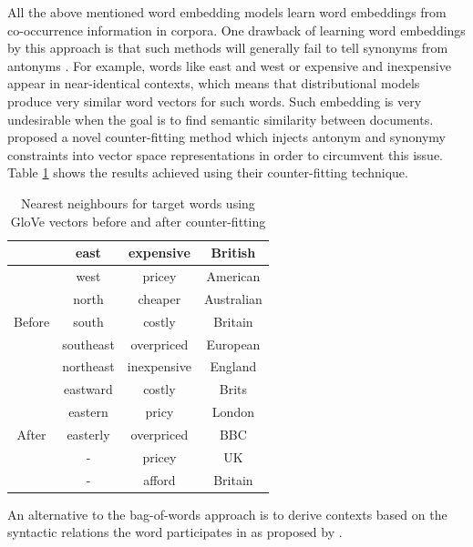  
 All the above mentioned word embedding models learn word embeddings from co-occurrence information in corpora.
 One drawback of learning word embeddings by this approach is that such methods will generally fail to tell synonyms from
 antonyms \citep{mohammad2008computing}. For example, words like east and west
 or expensive and inexpensive appear in near-identical contexts, which means
 that distributional models produce very similar word vectors for such words. Such embedding is very undesirable when the goal is to find semantic similarity between documents. 
 \citet{mrksic:2016:naacl} proposed a novel counter-fitting method which injects antonym and
 synonymy constraints into vector space representations in order to circumvent this issue. Table \ref{tab:counter_fitting} shows the results \citet{mrksic:2016:naacl} achieved using their counter-fitting technique.
 
 \begin{table}[h]
 	\begin{center}
 		\begin{tabular}{ c c c c } 
 			\hline
 			& east & expensive & British \\
 			\hline
 			\multirow{5}{4em}{Before} &
 			
 			west & pricey &  American
 			\\ 
 			& north & cheaper & Australian\\ 
 			& south & costly & Britain\\ 
 			& southeast & overpriced & European\\
 			& northeast & inexpensive & England\\
 			\hline
 			\multirow{5}{4em}{After} & 
 			eastward & costly & Brits\\ 
 			& eastern & pricy & London\\ 
 			& easterly & overpriced & BBC\\ 
 			& - & pricey & UK\\ 
 			& - & afford & Britain\\ 
 			\hline
 		\end{tabular}
 		
 	\end{center}
 	
 	\caption{Nearest neighbours for target words using GloVe
 		vectors before and after counter-fitting} \label{tab:counter_fitting}
 \end{table}
 
 An alternative to
 the bag-of-words approach is to derive contexts
 based on the syntactic relations the word participates
 in as proposed by \citet{levy2014dependency}.

